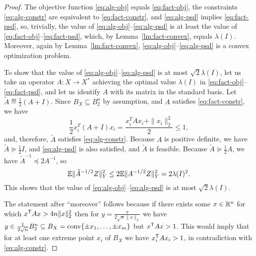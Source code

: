 \begin{proof}
  The objective function \eqref{eq:alg-obj} equals
  \eqref{eq:fact-obj}, the constraints \eqref{eq:alg-constr} are
  equivalent to \eqref{eq:fact-constr}, and \eqref{eq:alg-psd}
  implies \eqref{eq:fact-psd}, so, trivially, the value of
  \eqref{eq:alg-obj}--\eqref{eq:alg-psd} is at least the value of
  \eqref{eq:fact-obj}--\eqref{eq:fact-psd}, which, by
  Lemma~\ref{lm:fact-convex}, equals $\lambda(I)$. Moreover, again by
  Lemma~\ref{lm:fact-convex}, \eqref{eq:alg-obj}--\eqref{eq:alg-psd}
  is a convex optimization problem. 
  
  To show that the value of \eqref{eq:alg-obj}--\eqref{eq:alg-psd} is
  at most $\sqrt{2}\lambda(I)$, let us take an operator $A:X\to X^*$
  achieving the optimal value $\lambda(I)$ in
  \eqref{eq:fact-obj}--\eqref{eq:fact-psd}, and let us identify $A$
  with its matrix in the standard basis. Let $\tilde{A} \eqdef
  \frac12(A + I)$. Since $B_X \subseteq B_2^n$ by assumption, and $A$
  satisfies \eqref{eq:fact-constr}, we have
  \[
  \frac12 x_i^T (A + I) x_i = \frac{x_i^T A x_i + \|x_i \|_2^2 }{2} 
  \le 1,
  \]
  and, therefore, $\tilde{A}$ satisfies \eqref{eq:alg-constr}. Because
  $A$ is positive definite, we have $\tilde{A} \succeq \frac12 I$, and
  \eqref{eq:alg-psd} is also satisfied, and $\tilde{A}$ is feasible. Because
  $\tilde{A} \succeq \frac12 A$, we have $\tilde{A}^{-1} \preceq
  2A^{-1}$, so
  \[
  \mathbb{E}\|\tilde{A}^{-1/2} Z\|^2_Y \le 2 \mathbb{E}\|A^{-1/2} Z\|^2_Y =
  2\lambda(I)^2.
  \]
  This shows that the value of
  \eqref{eq:alg-obj}--\eqref{eq:alg-psd} is at most
  $\sqrt{2}\lambda(I)$. 

  The statement after ``moreover'' follows because if there exists
  some $x \in {\mathbb{R}}^n$ for which $x^\mathsf T A x > 4n \|x\|_2^2$ then for $y =
  \frac{x}{2\sqrt{n}\|x\|_2}$ we have $y \in \frac{1}{2\sqrt{n}}B_2^n
  \subseteq B_X = \operatorname{conv}\{\pm x_1,
  \ldots, \pm x_m\}$ but $x^\mathsf T A x > 1$. This would imply that for at
  least one extreme point $x_i$ of $B_X$ we have $x_i^\mathsf T A x_i > 1$, in
  contradiction with \eqref{eq:alg-constr}. 
\end{proof}

